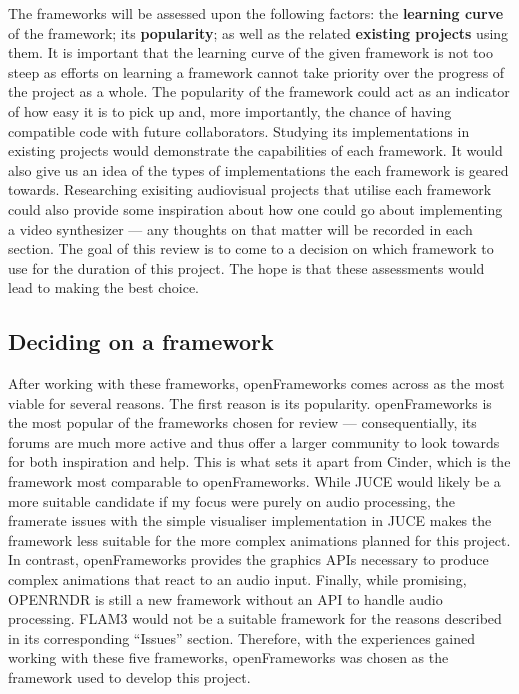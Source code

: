 \documentclass[../initial_thesis.tex]{subfiles}
\begin{document}
The frameworks will be assessed upon the following factors: the \textbf{learning curve} of the framework; its \textbf{popularity}; as well as the related \textbf{existing projects} using them. It is important that the learning curve of the given framework is not too steep as efforts on learning a framework cannot take priority over the progress of the project as a whole. The popularity of the framework could act as an indicator of how easy it is to pick up and, more importantly, the chance of having compatible code with future collaborators. Studying its implementations in existing projects would demonstrate the capabilities of each framework. It would also give us an idea of the types of implementations the each framework is geared towards. Researching exisiting audiovisual projects that utilise each framework could also provide some inspiration about how one could go about implementing a video synthesizer --- any thoughts on that matter will be recorded in each section. The goal of this review is to come to a decision on which framework to use for the duration of this project. The hope is that these assessments would lead to making the best choice.







\subsection{Deciding on a framework}
After working with these frameworks, openFrameworks comes across as the most viable for several reasons. The first reason is its popularity. openFrameworks is the most popular of the frameworks chosen for review --- consequentially, its forums are much more active and thus offer a larger community to look towards for both inspiration and help. This is what sets it apart from Cinder, which is the framework most comparable to openFrameworks. While JUCE would likely be a more suitable candidate if my focus were purely on audio processing, the framerate issues with the simple visualiser implementation in JUCE makes the framework less suitable for the more complex animations planned for this project. In contrast, openFrameworks provides the graphics APIs necessary to produce complex animations that react to an audio input. Finally, while promising, OPENRNDR is still a new framework without an API to handle audio processing. FLAM3 would not be a suitable framework for the reasons described in its corresponding ``Issues'' section. Therefore, with the experiences gained working with these five frameworks, openFrameworks was chosen as the framework used to develop this project.
\end{document}
